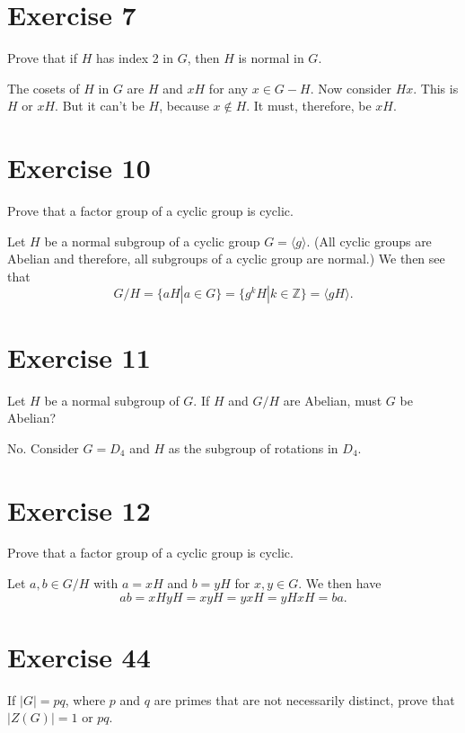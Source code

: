 \documentclass[12pt]{article}
\newcommand{\Z}{\mathbb{Z}}
\begin{document}
\section*{Exercise 7}

Prove that if $H$ has index 2 in $G$, then $H$ is normal in $G$.

The cosets of $H$ in $G$ are $H$ and $xH$ for any $x\in G-H$.
Now consider $Hx$.  This is $H$ or $xH$.  But it can't be $H$, because $x\not\in H$.
It must, therefore, be $xH$.

\section*{Exercise 10}

Prove that a factor group of a cyclic group is cyclic.

Let $H$ be a normal subgroup of a cyclic group $G=\langle g\rangle$.
(All cyclic groups are Abelian and therefore, all subgroups of a cyclic
group are normal.)  We then see that
\begin{equation*}
G/H = \{aH|a\in G\}=\{g^kH|k\in\Z\}=\langle gH\rangle.
\end{equation*}

\section*{Exercise 11}

Let $H$ be a normal subgroup of $G$.  If $H$ and $G/H$ are Abelian, must $G$
be Abelian?

No.  Consider $G=D_4$ and $H$ as the subgroup of rotations in $D_4$.

\section*{Exercise 12}

Prove that a factor group of a cyclic group is cyclic.

Let $a,b\in G/H$ with $a=xH$ and $b=yH$ for $x,y\in G$.
We then have
\begin{equation*}
ab=xHyH=xyH=yxH=yHxH=ba.
\end{equation*}

\section*{Exercise 44}

If $|G|=pq$, where $p$ and $q$ are primes that are not necessarily distinct,
prove that $|Z(G)|=1$ or $pq$.
\end{document}
